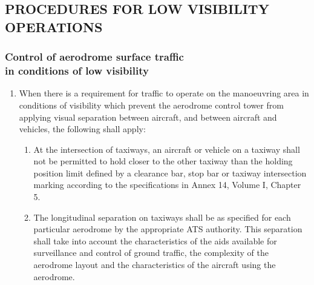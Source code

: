 \subsection[Procedures for low visibility operations]{PROCEDURES FOR LOW VISIBILITY OPERATIONS}

\subsubsection[Control of aerodrome surface traffic in conditions of low visibility]{Control of aerodrome surface traffic \\ in conditions of low visibility}




\begin{enumerate}
    \item When there is a requirement for traffic to operate on the manoeuvring area in conditions of visibility which prevent the aerodrome control tower from applying visual separation between aircraft, and between aircraft and vehicles, the following shall apply:

    \begin{enumerate}
        \item At the intersection of taxiways, an aircraft or vehicle on a taxiway shall not be permitted to hold closer to the other taxiway than the holding position limit defined by a clearance bar, stop bar or taxiway intersection marking according to the specifications in Annex 14, Volume I, Chapter 5.
        \item The longitudinal separation on taxiways shall be as specified for each particular aerodrome by the appropriate ATS authority. This separation shall take into account the characteristics of the aids available for surveillance and control of ground traffic, the complexity of the aerodrome layout and the characteristics of the aircraft using the aerodrome.
    \end{enumerate}

\end{enumerate}

